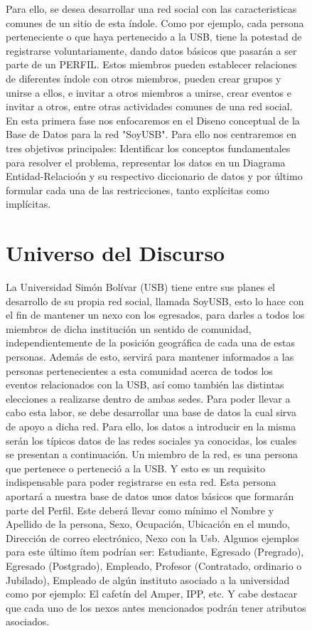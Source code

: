 \documentclass{article}
\begin{document}
\begin{figure}[h]
\newline
	Para ello, se desea desarrollar una red social con las caracteristicas comunes de un sitio de esta \'indole. Como por ejemplo, cada persona 
perteneciente o que haya pertenecido a la USB, tiene la potestad de registrarse voluntariamente, dando datos b\'asicos que pasar\'an a ser parte de 
un PERFIL. Estos miembros pueden establecer relaciones de diferentes \'indole con otros miembros, pueden crear grupos y unirse a ellos, e invitar a otros miembros a unirse, crear eventos e invitar a otros, entre otras actividades comunes de una red social.\\

\newline
	En esta primera fase nos enfocaremos en el Diseno conceptual de la Base de Datos para la red "SoyUSB". Para ello nos centraremos en tres objetivos principales: Identificar los conceptos fundamentales para resolver el problema, representar los datos en un Diagrama Entidad-Relacio\'on y su respectivo diccionario de datos y por \'ultimo formular cada una de las restricciones, tanto expl\'icitas como impl\'icitas.\\

\newpage

\section{Universo del Discurso}
	La Universidad Sim\'on Bol\'ivar (USB) tiene entre sus planes el desarrollo de su propia red social, llamada SoyUSB,  esto lo hace con el fin de mantener un nexo con los egresados, para darles a todos los miembros de dicha instituci\'on un sentido de comunidad, independientemente de la posici\'on geogr\'afica de cada una de estas personas. Adem\'as de esto, servir\'a para mantener informados a las personas pertenecientes a esta comunidad acerca de todos los eventos relacionados con la USB, as\'i como tambi\'en las distintas elecciones a realizarse dentro de ambas sedes.
	Para poder llevar a cabo esta labor, se debe desarrollar una base de datos la cual sirva de apoyo a dicha red. Para ello, los datos a introducir en la misma ser\'an los t\'ipicos datos de las redes sociales ya conocidas, los cuales se presentan a continuaci\'on.
	Un miembro de la red, es una persona que pertenece o perteneci\'o a la USB. Y esto es un requisito indispensable para poder registrarse en esta red. Esta persona aportar\'a a nuestra base de datos unos datos b\'asicos que formar\'an parte del Perfil. Este deber\'a llevar como m\'inimo el Nombre y Apellido de la persona, Sexo, Ocupaci\'on, Ubicaci\'on en el mundo, Direcci\'on de correo electr\'onico, Nexo con la Usb. Algunos ejemplos para este \'ultimo \'item podr\'ian ser: Estudiante, Egresado (Pregrado), Egresado (Postgrado), Empleado, Profesor (Contratado, ordinario o Jubilado), Empleado de alg\'un instituto asociado a la universidad como por ejemplo: El cafet\'in del Amper, IPP, etc. Y cabe destacar que cada uno de los nexos antes mencionados podr\'an tener atributos asociados.\\
\newline


\end{figure}
\end{document}
